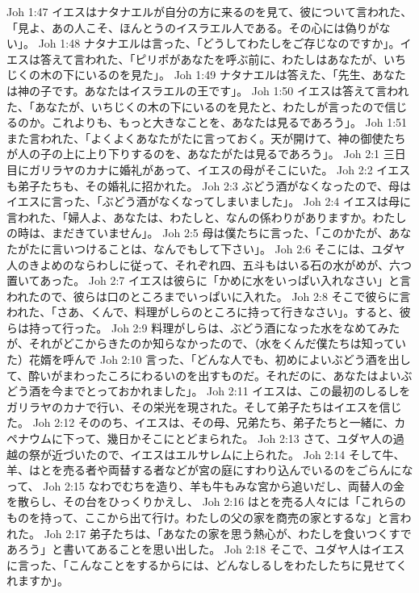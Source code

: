 Joh 1:47  イエスはナタナエルが自分の方に来るのを見て、彼について言われた、「見よ、あの人こそ、ほんとうのイスラエル人である。その心には偽りがない」。
Joh 1:48  ナタナエルは言った、「どうしてわたしをご存じなのですか」。イエスは答えて言われた、「ピリポがあなたを呼ぶ前に、わたしはあなたが、いちじくの木の下にいるのを見た」。
Joh 1:49  ナタナエルは答えた、「先生、あなたは神の子です。あなたはイスラエルの王です」。
Joh 1:50  イエスは答えて言われた、「あなたが、いちじくの木の下にいるのを見たと、わたしが言ったので信じるのか。これよりも、もっと大きなことを、あなたは見るであろう」。
Joh 1:51  また言われた、「よくよくあなたがたに言っておく。天が開けて、神の御使たちが人の子の上に上り下りするのを、あなたがたは見るであろう」。
Joh 2:1  三日目にガリラヤのカナに婚礼があって、イエスの母がそこにいた。
Joh 2:2  イエスも弟子たちも、その婚礼に招かれた。
Joh 2:3  ぶどう酒がなくなったので、母はイエスに言った、「ぶどう酒がなくなってしまいました」。
Joh 2:4  イエスは母に言われた、「婦人よ、あなたは、わたしと、なんの係わりがありますか。わたしの時は、まだきていません」。
Joh 2:5  母は僕たちに言った、「このかたが、あなたがたに言いつけることは、なんでもして下さい」。
Joh 2:6  そこには、ユダヤ人のきよめのならわしに従って、それぞれ四、五斗もはいる石の水がめが、六つ置いてあった。
Joh 2:7  イエスは彼らに「かめに水をいっぱい入れなさい」と言われたので、彼らは口のところまでいっぱいに入れた。
Joh 2:8  そこで彼らに言われた、「さあ、くんで、料理がしらのところに持って行きなさい」。すると、彼らは持って行った。
Joh 2:9  料理がしらは、ぶどう酒になった水をなめてみたが、それがどこからきたのか知らなかったので、（水をくんだ僕たちは知っていた）花婿を呼んで
Joh 2:10  言った、「どんな人でも、初めによいぶどう酒を出して、酔いがまわったころにわるいのを出すものだ。それだのに、あなたはよいぶどう酒を今までとっておかれました」。
Joh 2:11  イエスは、この最初のしるしをガリラヤのカナで行い、その栄光を現された。そして弟子たちはイエスを信じた。
Joh 2:12  そののち、イエスは、その母、兄弟たち、弟子たちと一緒に、カペナウムに下って、幾日かそこにとどまられた。
Joh 2:13  さて、ユダヤ人の過越の祭が近づいたので、イエスはエルサレムに上られた。
Joh 2:14  そして牛、羊、はとを売る者や両替する者などが宮の庭にすわり込んでいるのをごらんになって、
Joh 2:15  なわでむちを造り、羊も牛もみな宮から追いだし、両替人の金を散らし、その台をひっくりかえし、
Joh 2:16  はとを売る人々には「これらのものを持って、ここから出て行け。わたしの父の家を商売の家とするな」と言われた。
Joh 2:17  弟子たちは、「あなたの家を思う熱心が、わたしを食いつくすであろう」と書いてあることを思い出した。
Joh 2:18  そこで、ユダヤ人はイエスに言った、「こんなことをするからには、どんなしるしをわたしたちに見せてくれますか」。

